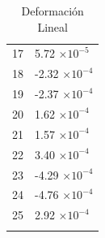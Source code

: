 \documentclass[a4paper,11pt]{article}
\begin{document}
\begin{center}
\begin{longtable}{|R{1.5cm}|R{2.5cm}|}
   17 &         5.72 $\times 10^{          -5}$ \\
   18 &        -2.32 $\times 10^{          -4}$ \\
   19 &        -2.37 $\times 10^{          -4}$ \\
   20 &         1.62 $\times 10^{          -4}$ \\
   21 &         1.57 $\times 10^{          -4}$ \\
 {\color{OliveGreen}  22} & {\color{OliveGreen}        3.40 $\times 10^{          -4}$} \\
   23 &        -4.29 $\times 10^{          -4}$ \\
 {\color{red}  24} & {\color{red}       -4.76 $\times 10^{          -4}$} \\
   25 &         2.92 $\times 10^{          -4}$ \\
\bottomrule[0.8mm]                               
\caption{Deformación Lineal}             
\end{longtable}                                  
\end{center}                                     
\end{document}
